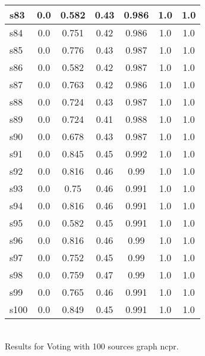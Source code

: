\documentclass{article}
\begin{document}
\begin{tabular}{|l|c|c|c|c|c|c|}
s83 &0.0 & 0.582 & 0.43 & 0.986 & 1.0 & 1.0\\
\hline
s84 &0.0 & 0.751 & 0.42 & 0.986 & 1.0 & 1.0\\
\hline
s85 &0.0 & 0.776 & 0.43 & 0.987 & 1.0 & 1.0\\
\hline
s86 &0.0 & 0.582 & 0.42 & 0.987 & 1.0 & 1.0\\
\hline
s87 &0.0 & 0.763 & 0.42 & 0.986 & 1.0 & 1.0\\
\hline
s88 &0.0 & 0.724 & 0.43 & 0.987 & 1.0 & 1.0\\
\hline
s89 &0.0 & 0.724 & 0.41 & 0.988 & 1.0 & 1.0\\
\hline
s90 &0.0 & 0.678 & 0.43 & 0.987 & 1.0 & 1.0\\
\hline
s91 &0.0 & 0.845 & 0.45 & 0.992 & 1.0 & 1.0\\
\hline
s92 &0.0 & 0.816 & 0.46 & 0.99 & 1.0 & 1.0\\
\hline
s93 &0.0 & 0.75 & 0.46 & 0.991 & 1.0 & 1.0\\
\hline
s94 &0.0 & 0.816 & 0.46 & 0.991 & 1.0 & 1.0\\
\hline
s95 &0.0 & 0.582 & 0.45 & 0.991 & 1.0 & 1.0\\
\hline
s96 &0.0 & 0.816 & 0.46 & 0.99 & 1.0 & 1.0\\
\hline
s97 &0.0 & 0.752 & 0.45 & 0.99 & 1.0 & 1.0\\
\hline
s98 &0.0 & 0.759 & 0.47 & 0.99 & 1.0 & 1.0\\
\hline
s99 &0.0 & 0.765 & 0.46 & 0.991 & 1.0 & 1.0\\
\hline
s100 &0.0 & 0.849 & 0.45 & 0.991 & 1.0 & 1.0\\
\hline
\end{tabular}\\

\noindent Results for Voting with 100 sources graph ncpr.
\end{document}
